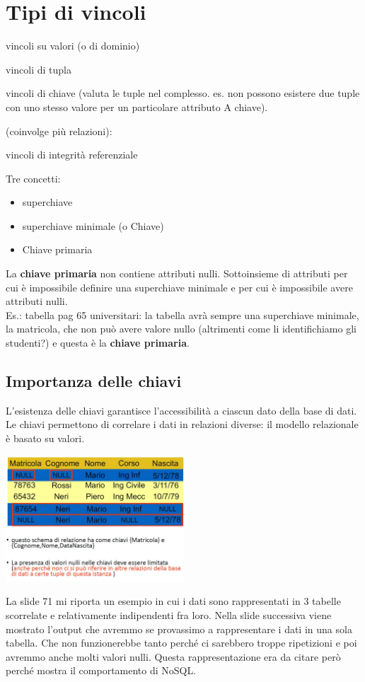 \section{Tipi di vincoli}
\begin{description}
    \item[vincoli intrarelazionali:]
    \item vincoli su valori (o di dominio)
    \item vincoli di tupla
    \item vincoli di chiave (valuta le tuple nel complesso. es. non possono esistere due tuple con uno stesso valore per un particolare attributo A chiave).
    \item[vincoli interrelazionali] (coinvolge più relazioni): 
    \item vincoli di integrità referenziale
\end{description}
Tre concetti:
\begin{itemize}
    \item superchiave
    \item superchiave minimale (o Chiave)
    \item Chiave primaria
\end{itemize}
La \textbf{chiave primaria} non contiene attributi nulli. Sottoinsieme di attributi per cui è impossibile definire una superchiave minimale e per cui è impossibile avere attributi nulli.
\\Es.: tabella pag 65 universitari: la tabella avrà sempre una superchiave minimale, la matricola, che non può avere valore nullo (altrimenti come li identifichiamo gli studenti?) e questa è la \textbf{chiave primaria}.

\subsection{Importanza delle chiavi}
L'esistenza delle chiavi garantisce l'accessibilità a ciascun dato della base di dati.
\\Le chiavi permettono di correlare i dati in relazioni diverse: il modello relazionale è basato su valori.
\begin{center}
    \includegraphics[width=0.5\textwidth]{chaptersLezioniSara/img/MR_chiavi777.jpg}
\end{center}
La slide 71 mi riporta un esempio in cui i dati sono rappresentati in 3 tabelle scorrelate e relativamente indipendenti fra loro. Nella slide successiva viene mostrato l'output che avremmo se provassimo a rappresentare i dati in una sola tabella. Che non funzionerebbe tanto perché ci sarebbero troppe ripetizioni e poi avremmo anche molti valori nulli. Questa rappresentazione era da citare però perché mostra il comportamento di NoSQL.

